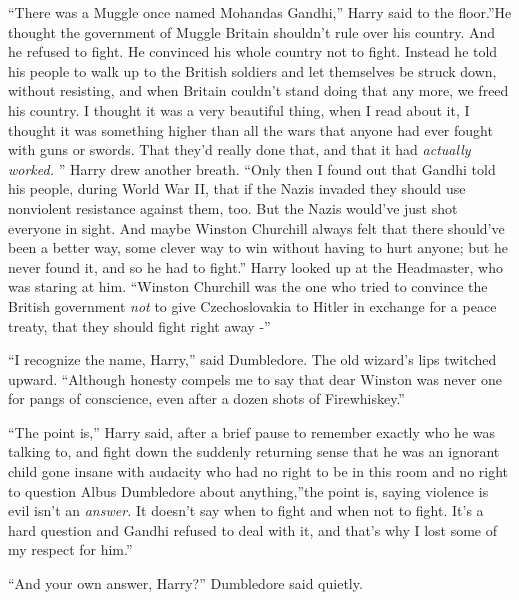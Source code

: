 ``There was a Muggle once named Mohandas Gandhi,'' Harry said to the
floor.''He thought the government of Muggle Britain shouldn't rule over
his country. And he refused to fight. He convinced his whole country not
to fight. Instead he told his people to walk up to the British soldiers
and let themselves be struck down, without resisting, and when Britain
couldn't stand doing that any more, we freed his country. I thought it
was a very beautiful thing, when I read about it, I thought it was
something higher than all the wars that anyone had ever fought with guns
or swords. That they'd really done that, and that it had \emph{actually
worked.} '' Harry drew another breath. ``Only then I found out that
Gandhi told his people, during World War II, that if the Nazis invaded
they should use nonviolent resistance against them, too. But the Nazis
would've just shot everyone in sight. And maybe Winston Churchill always
felt that there should've been a better way, some clever way to win
without having to hurt anyone; but he never found it, and so he had to
fight.'' Harry looked up at the Headmaster, who was staring at him.
``Winston Churchill was the one who tried to convince the British
government \emph{not} to give Czechoslovakia to Hitler in exchange for a
peace treaty, that they should fight right away -''

``I recognize the name, Harry,'' said Dumbledore. The old wizard's lips
twitched upward. ``Although honesty compels me to say that dear Winston
was never one for pangs of conscience, even after a dozen shots of
Firewhiskey.''

``The point is,'' Harry said, after a brief pause to remember exactly
who he was talking to, and fight down the suddenly returning sense that
he was an ignorant child gone insane with audacity who had no right to
be in this room and no right to question Albus Dumbledore about
anything,''the point is, saying violence is evil isn't an \emph{answer.}
It doesn't say when to fight and when not to fight. It's a hard question
and Gandhi refused to deal with it, and that's why I lost some of my
respect for him.''

``And your own answer, Harry?'' Dumbledore said quietly.

